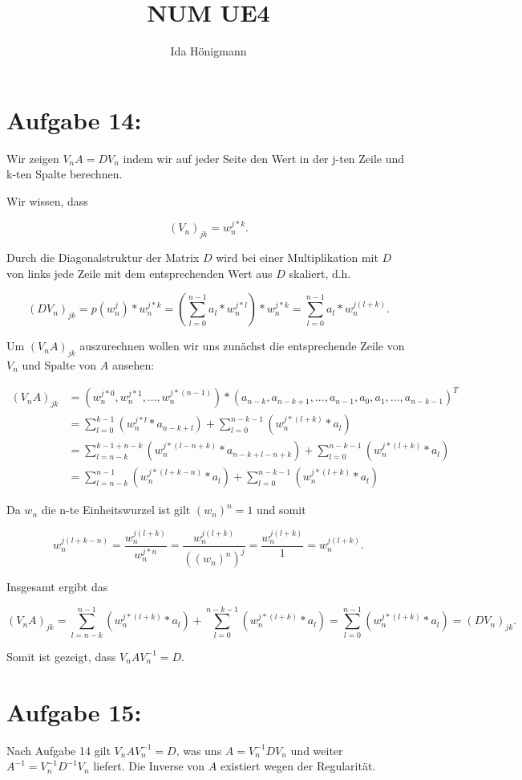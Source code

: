 \documentclass[]{article}
\title{NUM UE4}
\author{Ida Hönigmann}
\begin{document}
\maketitle

\section{Aufgabe 14:}
Wir zeigen $V_nA = DV_n$ indem wir auf jeder Seite den Wert in der j-ten Zeile und k-ten Spalte berechnen.

Wir wissen, dass

\[
(V_n)_{jk} = w_n^{j*k}.
\]

Durch die Diagonalstruktur der Matrix $D$ wird bei einer Multiplikation mit $D$ von links jede Zeile mit dem entsprechenden Wert aus $D$ skaliert, d.h.

\[
(DV_n)_{jk} = p(w_n^j)*w_n^{j*k} = (\sum_{l=0}^{n-1}a_l*w_n^{j*l}) * w_n^{j*k} = \sum_{l=0}^{n-1}a_l*w_n^{j(l+k)}.
\]

Um $(V_nA)_{jk}$ auszurechnen wollen wir uns zunächst die entsprechende Zeile von $V_n$ und Spalte von $A$ ansehen:

\begin{align*}
(V_nA)_{jk} &= (w_n^{j*0}, w_n^{j*1}, ..., w_n^{j*(n-1)}) * (a_{n-k}, a_{n-k+1}, ..., a_{n-1}, a_0, a_1, ..., a_{n-k-1})^T \\
 &= \sum_{l=0}^{k-1} (w_n^{j*l} * a_{n-k+l}) + \sum_{l=0}^{n-k-1} (w_n^{j*(l+k)}*a_l) \\
 &= \sum_{l=n-k}^{k-1+n-k} (w_n^{j*(l-n+k)} * a_{n-k+l-n+k}) + \sum_{l=0}^{n-k-1} (w_n^{j*(l+k)}*a_l) \\
  &= \sum_{l=n-k}^{n-1} (w_n^{j*(l+k-n)} * a_{l}) + \sum_{l=0}^{n-k-1} (w_n^{j*(l+k)}*a_l)
\end{align*}

Da $w_n$ die n-te Einheitswurzel ist gilt $(w_n)^n = 1$ und somit

\[
w_n^{j(l+k-n)} = \frac{w_n^{j(l+k)}}{w_n^{j*n}} = \frac{w_n^{j(l+k)}}{((w_n)^{n})^{j}} = \frac{w_n^{j(l+k)}}{1} = w_n^{j(l+k)}.
\]

Insgesamt ergibt das

\[
(V_nA)_{jk} = \sum_{l=n-k}^{n-1} (w_n^{j*(l+k)} * a_{l}) + \sum_{l=0}^{n-k-1} (w_n^{j*(l+k)}*a_l) = \sum_{l=0}^{n-1} (w_n^{j*(l+k)} * a_{l}) = (DV_n)_{jk}.
\]

Somit ist gezeigt, dass $V_nAV_n^{-1} = D$.

\section{Aufgabe 15:}
Nach Aufgabe 14 gilt $V_nAV_n^{-1} = D$, was uns $A = V_n^{-1}DV_n$ und weiter $A^{-1}=V_n^{-1}D^{-1}V_n$ liefert. Die Inverse von $A$ existiert wegen der Regularität.
\end{document}
